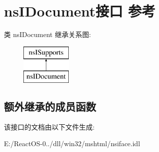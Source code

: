\hypertarget{interfacens_i_document}{}\section{ns\+I\+Document接口 参考}
\label{interfacens_i_document}
类 ns\+I\+Document 继承关系图\+:\begin{figure}[H]
\begin{center}
\leavevmode
\includegraphics[height=2.000000cm]{interfacens_i_document}
\end{center}
\end{figure}
\subsection*{额外继承的成员函数}


该接口的文档由以下文件生成\+:\begin{DoxyCompactItemize}
\item 
E\+:/\+React\+O\+S-\/0../dll/win32/mshtml/nsiface.\+idl\end{DoxyCompactItemize}
